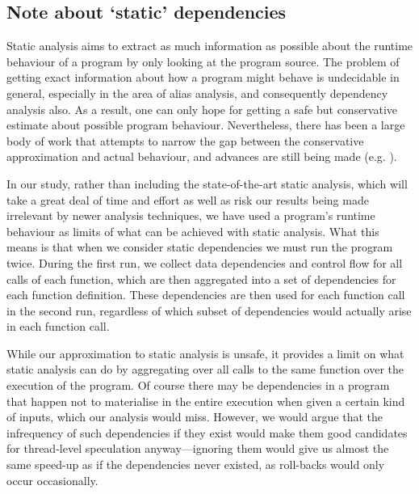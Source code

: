 \subsection{Note about `static' dependencies}
Static analysis aims to extract as much information as possible about the runtime behaviour of a program by only looking at the program source.
The problem of getting exact information about how a program might behave is undecidable in general, especially in the area of alias analysis\cite{landi92undecidability}, and consequently dependency analysis also.
As a result, one can only hope for getting a safe but conservative estimate about possible program behaviour.
Nevertheless, there has been a large body of work that attempts to narrow the gap between the conservative approximation and actual behaviour\cite{kennedy02optimizing}, and advances are still being made (e.g. \cite{raza09automatic}).

In our study, rather than including the state-of-the-art static analysis, which will take a great deal of time and effort as well as risk our results being made irrelevant by newer analysis techniques, we have used a program's runtime behaviour as limits of what can be achieved with static analysis.
What this means is that when we consider static dependencies we must run the program twice.
During the first run, we collect data dependencies and control flow for all calls of each function, which are then aggregated into a set of dependencies for each function definition.
These dependencies are then used for each function call in the second run, regardless of which subset of dependencies would actually arise in each function call.

While our approximation to static analysis is unsafe, it provides a limit on what static analysis can do by aggregating over all calls to the same function over the execution of the program.
Of course there may be dependencies in a program that happen not to materialise in the entire execution when given a certain kind of inputs, which our analysis would miss.
However, we would argue that the infrequency of such dependencies if they exist would make them good candidates for thread-level speculation anyway---ignoring them would give us almost the same speed-up as if the dependencies never existed, as roll-backs would only occur occasionally.
